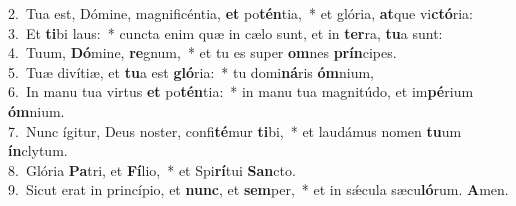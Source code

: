 {2.~}Tua est, Dómine, magnificéntia, \textbf{et} po\textbf{tén}tia,~* et glória, \textbf{at}que vi\textbf{ctó}ria:\\
{3.~}Et \textbf{ti}bi laus:~* cuncta enim quæ in cælo sunt, et in \textbf{ter}ra, \textbf{tu}a sunt:\\
{4.~}Tuum, \textbf{Dó}mine, \textbf{re}gnum,~* et tu es super \textbf{om}nes \textbf{prín}cipes.\\
{5.~}Tuæ divítiæ, et \textbf{tu}a est \textbf{gló}ria:~* tu domi\textbf{ná}ris \textbf{óm}nium,\\
{6.~}In manu tua virtus \textbf{et} po\textbf{tén}tia:~* in manu tua magnitúdo, et im\textbf{pé}rium \textbf{óm}nium.\\
{7.~}Nunc ígitur, Deus noster, confi\textbf{té}mur \textbf{ti}bi,~* et laudámus nomen \textbf{tu}um \textbf{ín}clytum.\\
{8.~}Glória \textbf{Pa}tri, et \textbf{Fí}lio,~* et Spi\textbf{rí}tui \textbf{San}cto.\\
{9.~}Sicut erat in princípio, et \textbf{nunc}, et \textbf{sem}per,~* et in sǽcula sæcu\textbf{ló}rum. \textbf{A}men.\\
